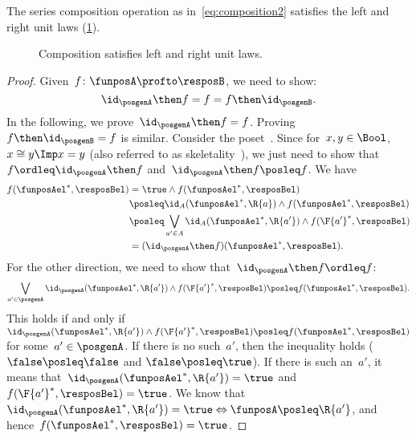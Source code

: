 \begin{lemma}\label{lem:compositionunital}
  The series composition operation as in~\cref{eq:composition2} satisfies the left and right unit laws (\cref{fig:compositionunital}).
\end{lemma}
  \begin{figure}[h!]
    \begin{center}
    \end{center}
    \caption{Composition satisfies left and right unit laws. \label{fig:compositionunital}}
  \end{figure}
\begin{proof}
  Given~$f\colon \funposA\profto \resposB$, we need to show:
  \begin{equation*}
    \id_\posgenA \then f= f = f\then \id_\posgenB.
  \end{equation*}
  In the following, we prove~$\id_\posgenA \then f = f$. Proving~$f\then \id_\posgenB=f$ is similar.
  Consider the poset~\Bool. Since for~$x,y\in \Bool$,~$x\cong y \Imp x=y$ (also referred to as skeletality~\cite{fong2019}), we just need to show that~$f\ordleq \id_\posgenA\then f$ and~$\id_\posgenA\then f\posleq f$.
  We have
  \begin{equation*}
    \begin{aligned}
      f(\funposAel^*,\resposBel)&=\true \wedge f(\funposAel^*,\resposBel)\\
      &\posleq \id_A(\funposAel^*,\R{a}) \wedge f(\funposAel^*,\resposBel)\\
      &\posleq \bigvee_{a'\in A}\id_A(\funposAel^*,\R{a'})\wedge f(\F{a'}^*,\resposBel)\\
      &=(\id_\posgenA\then f)(\funposAel^*,\resposBel).
    \end{aligned}
  \end{equation*}
  For the other direction, we need to show that~$\id_\posgenA\then f\ordleq f$:
  \begin{equation*}
    \bigvee_{a'\in \posgenA}\id_\posgenA(\funposAel^*,\R{a'})\wedge f(\F{a'}^*,\resposBel) \posleq f(\funposAel^*,\resposBel).
  \end{equation*}
  This holds if and only if~$\id_\posgenA(\funposAel^*,\R{a'})\wedge f(\F{a'}^*,\resposBel) \posleq f(\funposAel^*,\resposBel)$ for some~$a'\in \posgenA$.
  If there is no such~$a'$, then the inequality holds ($\false \posleq \false$ and $\false \posleq \true$).
  If there is such an~$a'$, it means that~$\id_\posgenA(\funposAel^*,\R{a'})=\true$ and~$f(\F{a'}^*,\resposBel)=\true$.
  We know that~$\id_\posgenA(\funposAel^*,\R{a'})=\true \Leftrightarrow \funposA\posleq \R{a'}$, and hence~$f(\funposAel^*,\resposBel)=\true$.
\end{proof}
